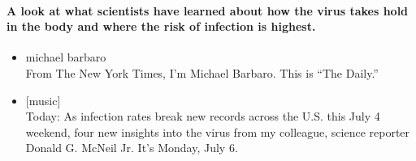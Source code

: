 \hypertarget{a-look-at-what-scientists-have-learned-about-how-the-virus-takes-hold-in-the-body-and-where-the-risk-of-infection-is-highest}{%
\paragraph{A look at what scientists have learned about how the virus
takes hold in the body and where the risk of infection is
highest.}\label{a-look-at-what-scientists-have-learned-about-how-the-virus-takes-hold-in-the-body-and-where-the-risk-of-infection-is-highest}}

\begin{itemize}
\item
  michael barbaro\\
  From The New York Times, I'm Michael Barbaro. This is ``The Daily.''
\item
  {[}music{]}\\
  Today: As infection rates break new records across the U.S. this July
  4 weekend, four new insights into the virus from my colleague, science
  reporter Donald G. McNeil Jr. It's Monday, July 6.


\end{itemize}
